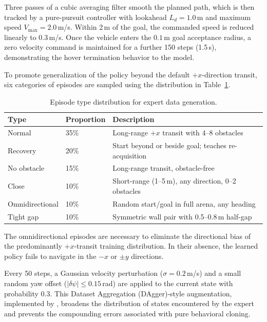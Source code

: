 \documentclass[12pt, a4paper]{article}
\begin{document}
Three passes of a cubic averaging filter smooth the planned path, which is then tracked by a pure-pursuit controller with lookahead $L_d = 1.0$\,m and maximum speed $V_{\max} = 2.0$\,m/s.
Within 2\,m of the goal, the commanded speed is reduced linearly to $0.3$\,m/s.
Once the vehicle enters the $0.1$\,m goal acceptance radius, a zero velocity command is maintained for a further 150 steps (1.5\,s), demonstrating the hover termination behavior to the model.


To promote generalization of the policy beyond the default $+x$-direction transit, six categories of episodes are sampled using the distribution in Table~\ref{tab:episode_types}.

\begin{table}[ht]
\centering
\caption{Episode type distribution for expert data generation.}
\label{tab:episode_types}
\begin{tabular}{lll}
\hline
Type & Proportion & Description \\
\hline
Normal      & 35\% & Long-range $+x$ transit with 4--8 obstacles \\
Recovery    & 20\% & Start beyond or beside goal; teaches re-acquisition \\
No obstacle & 15\% & Long-range transit, obstacle-free \\
Close       & 10\% & Short-range (1--5\,m), any direction, 0--2 obstacles \\
Omnidirectional & 10\% & Random start/goal in full arena, any heading \\
Tight gap   & 10\% & Symmetric wall pair with 0.5--0.8\,m half-gap \\
\hline
\end{tabular}
\end{table}

The omnidirectional episodes are necessary to eliminate the directional bias of the predominantly $+x$-transit training distribution.
In their absence, the learned policy fails to navigate in the $-x$ or $\pm y$ directions.

Every 50 steps, a Gaussian velocity perturbation ($\sigma = 0.2$\,m/s) and a small random yaw offset ($|\delta\psi| \leq 0.15$\,rad) are applied to the current state with probability 0.3.
This Dataset Aggregation (DAgger)-style augmentation, implemented by \textcite{levine_end--end_2016}, broadens the distribution of states encountered by the expert and prevents the compounding errors associated with pure behavioral cloning.
\end{document}

